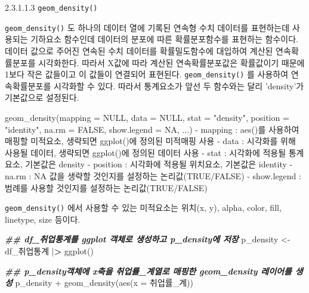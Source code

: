 \documentclass[
]{article}
\newenvironment{Shaded}{\begin{snugshade}}{\end{snugshade}}
\newcommand{\AttributeTok}[1]{\textcolor[rgb]{0.77,0.63,0.00}{#1}}
\newcommand{\ConstantTok}[1]{\textcolor[rgb]{0.00,0.00,0.00}{#1}}
\newcommand{\DocumentationTok}[1]{\textcolor[rgb]{0.56,0.35,0.01}{\textbf{\textit{#1}}}}
\newcommand{\ErrorTok}[1]{\textcolor[rgb]{0.64,0.00,0.00}{\textbf{#1}}}
\newcommand{\FunctionTok}[1]{\textcolor[rgb]{0.00,0.00,0.00}{#1}}
\newcommand{\NormalTok}[1]{#1}
\newcommand{\OtherTok}[1]{\textcolor[rgb]{0.56,0.35,0.01}{#1}}
\newcommand{\SpecialCharTok}[1]{\textcolor[rgb]{0.00,0.00,0.00}{#1}}
\newcommand{\StringTok}[1]{\textcolor[rgb]{0.31,0.60,0.02}{#1}}
\begin{document}
2.3.1.1.3 \texttt{geom\_density()}

\texttt{geom\_density()} 도 하나의 데이터 열에 기록된 연속형 수치 데이터를 표현하는데 사용되는 기하요소 함수인데 데이터의 분포에 따른 확률분포함수를 표현하는 함수이다. 데이터 값으로 주어진 연속된 수치 데이터를 확률밀도함수에 대입하여 계산된 연속확률분포를 시각화한다. 따라서 X값에 따라 계산된 연속확률분포값은 확률값이기 때문에 1보다 작은 값들이고 이 값들이 연결되어 표현된다. \texttt{geom\_density()} 를 사용하여 연속확률분포를 시각화할 수 있다. 따라서 통계요소가 앞선 두 함수와는 달리 'density'가 기본값으로 설정된다.

\begin{Shaded}
\begin{Highlighting}[]
\FunctionTok{geom\_density}\NormalTok{(}\AttributeTok{mapping =} \ConstantTok{NULL}\NormalTok{, }\AttributeTok{data =} \ConstantTok{NULL}\NormalTok{, }\AttributeTok{stat =} \StringTok{"density"}\NormalTok{,  }\AttributeTok{position =} \StringTok{"identity"}\NormalTok{, }\AttributeTok{na.rm =} \ConstantTok{FALSE}\NormalTok{, }\AttributeTok{show.legend =} \ConstantTok{NA}\NormalTok{, ...)}
  \SpecialCharTok{{-}}\NormalTok{ mapping }\SpecialCharTok{:} \FunctionTok{aes}\NormalTok{()를 사용하여 매핑할 미적요소, 생략되면 }\FunctionTok{ggplot}\NormalTok{()에 정의된 미적매핑 사용}
  \SpecialCharTok{{-}}\NormalTok{ data }\SpecialCharTok{:}\NormalTok{ 시각화를 위해 사용될 데이터, 생략되면 }\FunctionTok{ggplot}\NormalTok{()에 정의된 데이터 사용}
  \SpecialCharTok{{-}}\NormalTok{ stat }\SpecialCharTok{:}\NormalTok{ 시각화에 적용될 통계요소, 기본값은 }\StringTok{\textquotesingle{}density\textquotesingle{}}
  \SpecialCharTok{{-}}\NormalTok{ position }\SpecialCharTok{:}\NormalTok{ 시각화에 적용될 위치요소, 기본값은 }\StringTok{\textquotesingle{}identity\textquotesingle{}}
  \SpecialCharTok{{-}}\NormalTok{ na.rm }\SpecialCharTok{:} \ConstantTok{NA}\NormalTok{ 값을 생략할 것인지를 설정하는 논리값(}\ConstantTok{TRUE}\SpecialCharTok{/}\ConstantTok{FALSE}\NormalTok{)}
  \SpecialCharTok{{-}}\NormalTok{ show.legend }\SpecialCharTok{:}\NormalTok{ 범례를 사용할 것인지를 설정하는 논리값(}\ConstantTok{TRUE}\SpecialCharTok{/}\ConstantTok{FALSE}\NormalTok{)}
\end{Highlighting}
\end{Shaded}

\texttt{geom\_density()} 에서 사용할 수 있는 미적요소는 위치(x, y), alpha, color, fill, linetype, size 등이다.

\begin{Shaded}
\begin{Highlighting}[]
\DocumentationTok{\#\#  df\_취업통계를 ggplot 객체로 생성하고 p\_density에 저장}
\NormalTok{p\_density }\OtherTok{\textless{}{-}}\NormalTok{ df\_취업통계 }\SpecialCharTok{|}\ErrorTok{\textgreater{}}
  \FunctionTok{ggplot}\NormalTok{()}

\DocumentationTok{\#\# p\_density객체에 x축을 \textquotesingle{}취업률\_계\textquotesingle{}열로 매핑한 geom\_density 레이어를 생성}
\NormalTok{p\_density }\SpecialCharTok{+} 
  \FunctionTok{geom\_density}\NormalTok{(}\FunctionTok{aes}\NormalTok{(}\AttributeTok{x =}\NormalTok{ 취업률\_계))}
\end{Highlighting}
\end{Shaded}
\end{document}

